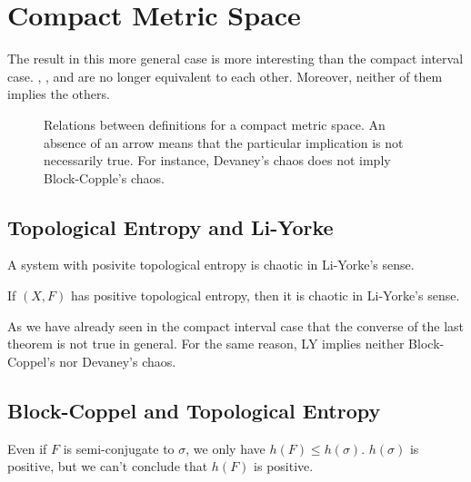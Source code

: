 \documentclass[12pt,twoside,draft]{book}
\begin{document}
\section{Compact Metric Space}
The result in this more general case is more interesting than the compact interval case.
\dev, \blcp, and \pte are no longer equivalent to each other.
Moreover, neither of them implies the others.
\begin{figure}[ht]
  \label{fig:chaos-metric}
  \caption{
    Relations between definitions for a compact metric space.
    An absence of an arrow means that the particular implication is not necessarily true.
    For instance, Devaney's chaos does not imply Block-Copple's chaos.
  }
\end{figure}

\subsection*{Topological Entropy and Li-Yorke}
A system with posivite topological entropy is chaotic in Li-Yorke's sense.
\begin{theorem}
  \citep{blanchard}
  If $(X,F)$ has positive topological entropy, then it is chaotic in Li-Yorke's sense.
  \label{thm:entropy-liyorke}
\end{theorem}
As we have already seen in the compact interval case that the converse of the last theorem is not true in general.
For the same reason, LY implies neither Block-Coppel's nor Devaney's chaos.

\subsection*{Block-Coppel and Topological Entropy}
Even if $F$ is semi-conjugate to $\sigma$, we only have $h(F) \leq h(\sigma)$.
$h(\sigma)$ is positive, but we can't conclude that $h(F)$ is positive.
\end{document}
